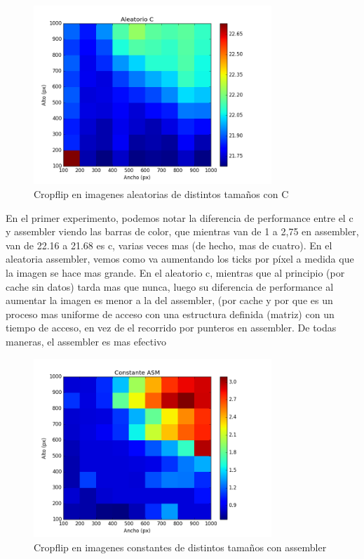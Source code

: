  \begin{figure} [H]
  \centering
  \includegraphics[width=0.8\textwidth]{recursos/aleatoriocropflipc.png}
    \caption{ Cropflip en imagenes aleatorias de distintos tamaños con C }
\end{figure}
 
 
\hfill \break
En el primer experimento, podemos notar la diferencia de performance entre el c y assembler viendo las barras de color, que mientras van de 1 a 2,75 en assembler, van de  22.16 a 21.68 es c, varias veces mas (de hecho, mas de cuatro). En el aleatoria assembler, vemos como va aumentando los ticks por píxel a medida que la imagen se hace mas grande. En el aleatorio c, mientras que al principio (por cache sin datos) tarda mas que nunca, luego su diferencia de performance al aumentar la imagen es menor a la del assembler, (por cache y por que es un proceso mas uniforme de acceso con una estructura definida (matriz) con un tiempo de acceso, en vez de el recorrido por punteros en assembler. De todas maneras, el assembler es mas efectivo
\hfill \break

\begin{figure} [H]
  \centering
  \includegraphics[width=0.8\textwidth]{recursos/constantecropflipasm.png}
    \caption{ Cropflip en imagenes constantes de distintos tamaños con assembler }
\end{figure}
 
